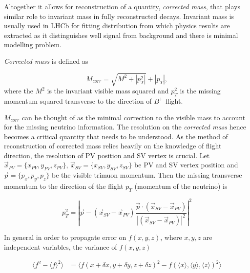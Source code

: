 Altogether it allows for reconstruction of a quantity, \textit{corrected mass}, that plays similar role to invariant mass in fully reconstructed decays. Invariant mass is usually used in \gls{LHCb} for fitting distribution from which physics results are extracted as it distinguishes well signal from background and there is minimal modelling problem.

\textit{Corrected mass} is defined as

\begin{equation}
	M_{corr} = \sqrt{{M}^{2} + |p^{2}_{T}|} + |p_{T}|,
\end{equation}	
where the $M^{2}$ is the invariant visible mass squared and $p^{2}_{T}$ is the missing momentum squared transverse to the direction of $B^{+}$ flight.


$M_{corr}$ can be thought of as the minimal correction to the visible mass to account for the missing neutrino information. The resolution on the \textit{corrected mass} hence becomes a critical quantity that needs to be understood. As the method of reconstruction of corrected mass relies heavily on the knowledge of \Bpm flight direction, the resolution of \gls{PV} position and \gls{SV} vertex is crucial. Let $\vec{{x}}_{PV}=\{x_{PV},y_{PV},z_{PV}\}$, $\vec{{x}}_{SV}=\{x_{SV},y_{SV},z_{SV}\} $ be \gls{PV} and \gls{SV} vertex position and $\vec{p}=\{p_{x},p_{y},p_{z}\}$ be the visible trimuon momentum. Then the missing transverse momentum to the direction of the flight $p_{T}$ (momentum of the neutrino) is


\begin{equation}
	p^{2}_{T} = |\vec{p} - (\vec{{x}}_{SV}-\vec{{x}}_{PV})\frac{\vec{p} \cdot(\vec{{x}}_{SV}-\vec{{x}}_{PV})}{|(\vec{{x}}_{SV}-\vec{{x}}_{PV})|^{2}}|^{2}
\end{equation}

In general in order to propagate error on $f(x,y,z)$, where $x,y,z$ are independent variables, the variance of $f(x,y,z)$

\begin{equation}
\begin{aligned}
	\langle f^{2}-\langle f \rangle^{2} \rangle  &=  \langle f(x+\delta x, y+\delta y, z+\delta z)^{2} - f(\langle x \rangle, \langle y \rangle, \langle z \rangle)^{2} \rangle \\
\end{aligned}
\end{equation}


